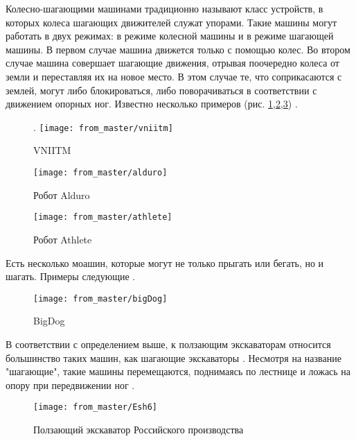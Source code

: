 Колесно-шагающими машинами традиционно называют класс устройств, в которых колеса шагающих движителей служат упорами. Такие машины могут работать в двух режимах: в режиме колесной машины и в режиме шагающей машины. В первом случае машина движется только с помощью колес. Во втором случае машина совершает шагающие движения, отрывая поочередно колеса от земли и переставляя их на новое место. В этом случае те, что соприкасаются с землей, могут либо блокироваться, либо поворачиваться в соответствии с движением опорных ног.
Известно несколько примеров (рис. \ref{fig:vniitm},\ref{fig:alduro},\ref{fig:athlete}) \cite{germann2001joystick}.

\begin{figure}[H].
\centering\texttt{[image: from\_master/vniitm]}
\caption{VNIITM}
\label{fig:vniitm}
\end{figure}

\begin{figure}[H]
\centering\texttt{[image: from\_master/alduro]}
\caption{Робот Alduro}
\label{fig:alduro}
\end{figure}

\begin{figure}[H]
\centering\texttt{[image: from\_master/athlete]}
\caption{Робот Athlete}
\label{fig:athlete}
\end{figure}

Есть несколько моашин, которые могут не только прыгать или бегать, но и шагать. Примеры следующие \cite{Pavl2013,volkovaModelirovanieDvizheniyaMnogozvennogo2013,bidgoly2010learning,yacunVibrorobotDlyaVertikalnogo2010} .

\begin{figure}[H]
    \centering\texttt{[image: from\_master/bigDog]}
\caption{BigDog}
\label{fig:bigDog}
\end{figure}

В соответствии с определением выше, к ползающим экскаваторам относится большинство таких машин, как шагающие экскаваторы . Несмотря на название "шагающие", такие машины перемещаются, поднимаясь по лестнице и ложась на опору при передвижении ног \cite{peters2010prototype,gradeckiySostoyaniePerspektivyRazvitiya2014,bidgoly2010learning}.

\begin{figure}[H]
\centering\texttt{[image: from\_master/Esh6]}
\caption{Ползающий экскаватор Российского производства}
\label{fig:Esh6}
\end{figure}

